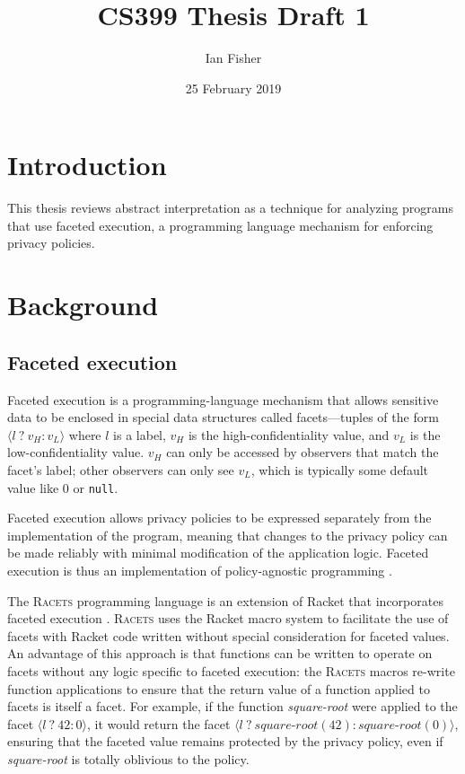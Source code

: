 \documentclass{article}
\title{CS399 Thesis Draft 1}
\author{Ian Fisher}
\date{25 February 2019}
\begin{document}
\maketitle

\section{Introduction}
This thesis reviews abstract interpretation as a technique for analyzing programs that use faceted execution, a programming language mechanism for enforcing privacy policies.

\section{Background}
\subsection{Faceted execution}
Faceted execution is a programming-language mechanism that allows sensitive data to be enclosed in special data structures called facets---tuples of the form $\langle l\ ?\ v_H : v_L \rangle$ where $l$ is a label, $v_H$ is the high-confidentiality value, and $v_L$ is the low-confidentiality value. $v_H$ can only be accessed by observers that match the facet's label; other observers can only see $v_L$, which is typically some default value like $0$ or \texttt{null}.

Faceted execution allows privacy policies to be expressed separately from the implementation of the program, meaning that changes to the privacy policy can be made reliably with minimal modification of the application logic. Faceted execution is thus an implementation of policy-agnostic programming \cite{faceted}.

The \textsc{Racets} programming language is an extension of Racket that incorporates faceted execution \cite{racets}. \textsc{Racets} uses the Racket macro system to facilitate the use of facets with Racket code written without special consideration for faceted values. An advantage of this approach is that functions can be written to operate on facets without any logic specific to faceted execution: the \textsc{Racets} macros re-write function applications to ensure that the return value of a function applied to facets is itself a facet. For example, if the function \textit{square-root} were applied to the facet $\langle l \ ?\ 42 : 0 \rangle$, it would return the facet $\langle l \ ?\ \textit{square-root}(42) : \textit{square-root}(0) \rangle$, ensuring that the faceted value remains protected by the privacy policy, even if \textit{square-root} is totally oblivious to the policy.
\end{document}
